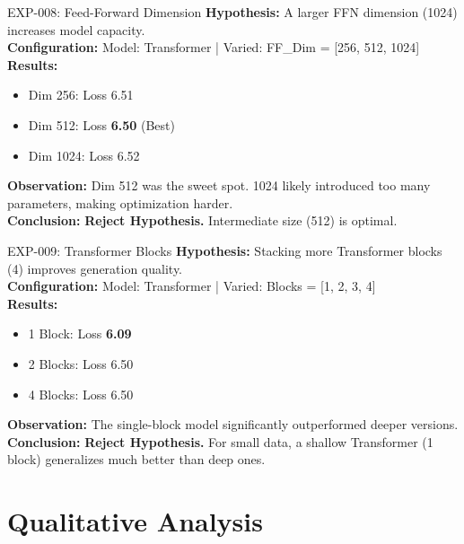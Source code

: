 \documentclass[12pt,a4paper]{article}
\begin{document}
\begin{experimentbox}{EXP-008: Feed-Forward Dimension}
\textbf{Hypothesis:} A larger FFN dimension (1024) increases model capacity. \\
\textbf{Configuration:} Model: Transformer | Varied: FF\_Dim = [256, 512, 1024] \\
\textbf{Results:}
\begin{itemize}
    \item Dim 256: Loss 6.51
    \item Dim 512: Loss \textbf{6.50} (Best)
    \item Dim 1024: Loss 6.52
\end{itemize}
\textbf{Observation:} Dim 512 was the sweet spot. 1024 likely introduced too many parameters, making optimization harder. \\
\textbf{Conclusion:} \textbf{Reject Hypothesis.} Intermediate size (512) is optimal.
\end{experimentbox}

\vspace{0.5cm}

\begin{experimentbox}{EXP-009: Transformer Blocks}
\textbf{Hypothesis:} Stacking more Transformer blocks (4) improves generation quality. \\
\textbf{Configuration:} Model: Transformer | Varied: Blocks = [1, 2, 3, 4] \\
\textbf{Results:}
\begin{itemize}
    \item 1 Block: Loss \textbf{6.09}
    \item 2 Blocks: Loss 6.50
    \item 4 Blocks: Loss 6.50
\end{itemize}
\textbf{Observation:} The single-block model significantly outperformed deeper versions. \\
\textbf{Conclusion:} \textbf{Reject Hypothesis.} For small data, a shallow Transformer (1 block) generalizes much better than deep ones.
\end{experimentbox}

\section{Qualitative Analysis}
\end{document}
